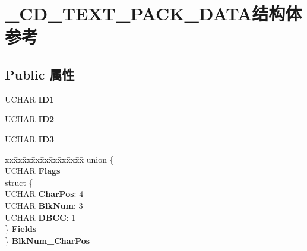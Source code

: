 \hypertarget{struct___c_d___t_e_x_t___p_a_c_k___d_a_t_a}{}\section{\+\_\+\+C\+D\+\_\+\+T\+E\+X\+T\+\_\+\+P\+A\+C\+K\+\_\+\+D\+A\+T\+A结构体 参考}
\label{struct___c_d___t_e_x_t___p_a_c_k___d_a_t_a}
\subsection*{Public 属性}
\begin{DoxyCompactItemize}
\item 
\mbox{\label{struct___c_d___t_e_x_t___p_a_c_k___d_a_t_a_a7d10b0517b82cb9898236a82eb41d43c}} 
U\+C\+H\+AR {\bfseries I\+D1}
\item 
\mbox{\label{struct___c_d___t_e_x_t___p_a_c_k___d_a_t_a_a50f0b836c4575f3f9efef04cc020e960}} 
U\+C\+H\+AR {\bfseries I\+D2}
\item 
\mbox{\label{struct___c_d___t_e_x_t___p_a_c_k___d_a_t_a_a8bb1ea921630ce2184e44506065d0ad5}} 
U\+C\+H\+AR {\bfseries I\+D3}
\item 
\mbox{\label{struct___c_d___t_e_x_t___p_a_c_k___d_a_t_a_ac2422fe1cd8b9e891c9e69ab3add6cc5}} 
\begin{tabbing}
xx\=xx\=xx\=xx\=xx\=xx\=xx\=xx\=xx\=\kill
union \{\\
\>UCHAR {\bfseries Flags}\\
\>struct \{\\
\>\>UCHAR {\bfseries CharPos}: 4\\
\>\>UCHAR {\bfseries BlkNum}: 3\\
\>\>UCHAR {\bfseries DBCC}: 1\\
\>\} {\bfseries Fields}\\
\} {\bfseries BlkNum\_CharPos}\\


\end{tabbing}
\end{DoxyCompactItemize}
